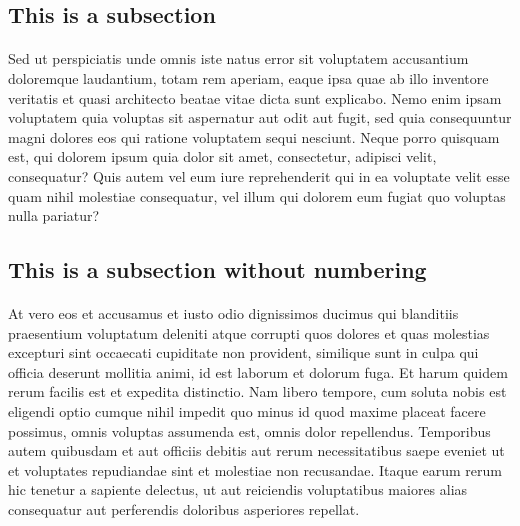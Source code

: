 \documentclass[a4paper]{article}
\begin{document}
\subsection{This is a subsection}
\paragraph{}
Sed ut perspiciatis unde omnis iste natus error sit voluptatem accusantium doloremque laudantium, totam rem aperiam,
eaque ipsa quae ab illo inventore veritatis et quasi architecto beatae vitae dicta sunt explicabo. Nemo enim ipsam
voluptatem quia voluptas sit aspernatur aut odit aut fugit, sed quia consequuntur magni dolores eos qui ratione
voluptatem sequi nesciunt. Neque porro quisquam est, qui dolorem ipsum quia dolor sit amet, consectetur, adipisci
velit, consequatur? Quis autem vel eum iure reprehenderit qui in ea voluptate velit esse quam nihil molestiae
consequatur, vel illum qui dolorem eum fugiat quo voluptas nulla pariatur?

\begin{table}[h!]
\centering
\caption{Fisher's Iris data}
\label{tab:table1}

\end{table}

\subsection*{This is a subsection without numbering}
\paragraph{}
At vero eos et accusamus et iusto odio dignissimos ducimus qui blanditiis praesentium voluptatum deleniti atque
corrupti quos dolores et quas molestias excepturi sint occaecati cupiditate non provident, similique sunt in culpa
qui officia deserunt mollitia animi, id est laborum et dolorum fuga. Et harum quidem rerum facilis est et expedita
distinctio. Nam libero tempore, cum soluta nobis est eligendi optio cumque nihil impedit quo minus id quod maxime
placeat facere possimus, omnis voluptas assumenda est, omnis dolor repellendus. Temporibus autem quibusdam et aut
officiis debitis aut rerum necessitatibus saepe eveniet ut et voluptates repudiandae sint et molestiae non recusandae.
Itaque earum rerum hic tenetur a sapiente delectus, ut aut reiciendis voluptatibus maiores alias consequatur aut
perferendis doloribus asperiores repellat.\cite{Prospector}
\end{document}
